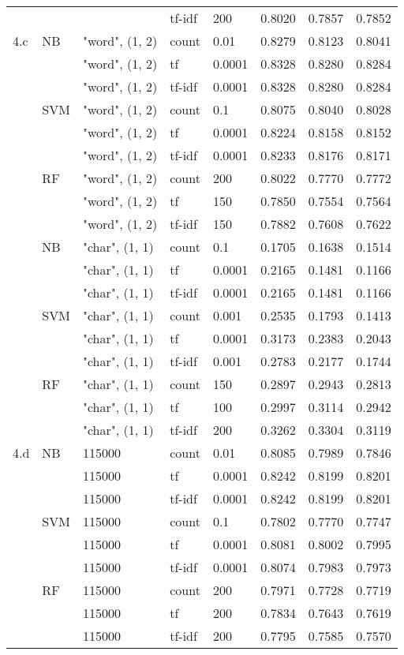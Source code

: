 \documentclass[12pt]{article}
\begin{document}
\begin{center}
\begin{supertabular}{llllllll}
            &&& tf-idf & 200 & 0.8020 & 0.7857 & 0.7852\\
        4.c & NB & "word", (1, 2) & count & 0.01 & 0.8279 & 0.8123 & 0.8041\\
            && "word", (1, 2) & tf & 0.0001 & 0.8328 & 0.8280 & 0.8284\\
            && "word", (1, 2) & tf-idf & 0.0001 & 0.8328 & 0.8280 & 0.8284\\
            & SVM & "word", (1, 2) & count & 0.1 & 0.8075 & 0.8040 & 0.8028\\
            && "word", (1, 2) & tf & 0.0001 & 0.8224 & 0.8158 & 0.8152\\
            && "word", (1, 2) & tf-idf & 0.0001 & 0.8233 & 0.8176 & 0.8171\\
            & RF & "word", (1, 2) & count & 200 & 0.8022 & 0.7770 & 0.7772\\
            && "word", (1, 2) & tf & 150 & 0.7850 & 0.7554 & 0.7564\\
            && "word", (1, 2) & tf-idf & 150 & 0.7882 & 0.7608 & 0.7622\\
            & NB & "char", (1, 1) & count & 0.1 & 0.1705 & 0.1638 & 0.1514\\
            && "char", (1, 1) & tf & 0.0001 & 0.2165 & 0.1481 & 0.1166\\
            && "char", (1, 1) & tf-idf & 0.0001 & 0.2165 & 0.1481 & 0.1166\\
            & SVM & "char", (1, 1) & count & 0.001 & 0.2535 & 0.1793 & 0.1413\\
            && "char", (1, 1) & tf & 0.0001 & 0.3173 & 0.2383 & 0.2043\\
            && "char", (1, 1) & tf-idf & 0.001 & 0.2783 & 0.2177 & 0.1744\\
            & RF & "char", (1, 1) & count & 150 & 0.2897 & 0.2943 & 0.2813\\
            && "char", (1, 1) & tf & 100 & 0.2997 & 0.3114 & 0.2942\\
            && "char", (1, 1) & tf-idf & 200 & 0.3262 & 0.3304 & 0.3119\\
        4.d & NB & 115000 & count & 0.01 & 0.8085 & 0.7989 & 0.7846\\
            && 115000 & tf & 0.0001 & 0.8242 & 0.8199 & 0.8201\\
            && 115000 & tf-idf & 0.0001 & 0.8242 & 0.8199 & 0.8201\\
            & SVM & 115000 & count & 0.1 & 0.7802 & 0.7770 & 0.7747\\
            && 115000 & tf & 0.0001 & 0.8081 & 0.8002 & 0.7995\\
            && 115000 & tf-idf & 0.0001 & 0.8074 & 0.7983 & 0.7973\\
            & RF & 115000 & count & 200 & 0.7971 & 0.7728 & 0.7719\\
            && 115000 & tf & 200 & 0.7834 & 0.7643 & 0.7619\\
            && 115000 & tf-idf & 200 & 0.7795 & 0.7585 & 0.7570\\
\end{supertabular}
\end{center}
\end{document}

